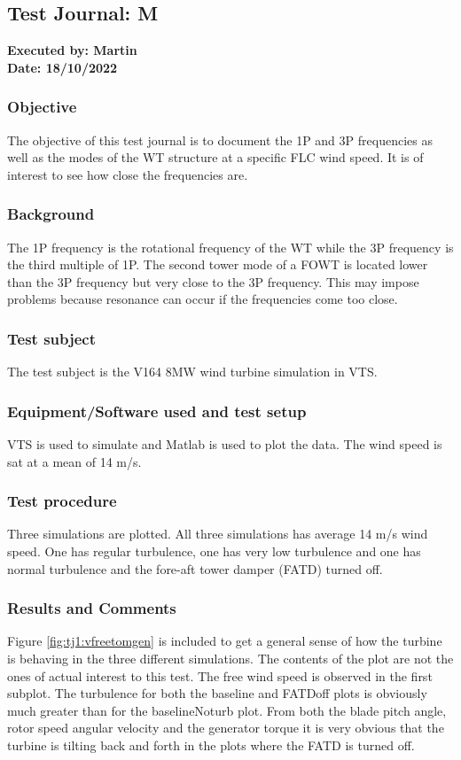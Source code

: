 \subsection{Test Journal: M} \label{app:tj_01}

\textbf{Executed by: Martin} \\
\textbf{Date: 18/10/2022}

\subsubsection{Objective}
The objective of this test journal is to document the 1P and 3P frequencies as well as the modes of the WT structure at a specific FLC wind speed. It is of interest to see how close the frequencies are.

\subsubsection{Background}
The 1P frequency is the rotational frequency of the WT while the 3P frequency is the third multiple of 1P. The second tower mode of a FOWT is located lower than the 3P frequency but very close to the 3P frequency. This may impose problems because resonance can occur if the frequencies come too close.

\subsubsection{Test subject}
The test subject is the V164 8MW wind turbine simulation in VTS.

\subsubsection{Equipment/Software used and test setup}
VTS is used to simulate and Matlab is used to plot the data. The wind speed is sat at a mean of 14 m/s.

\subsubsection{Test procedure}
Three simulations are plotted. All three simulations has average 14 m/s wind speed. One has regular turbulence, one has very low turbulence and one has normal turbulence and the fore-aft tower damper (FATD) turned off.

\subsubsection{Results and Comments}
Figure \cref{fig:tj1:vfreetomgen} is included to get a general sense of how the turbine is behaving in the three different simulations. The contents of the plot are not the ones of actual interest to this test. The free wind speed is observed in the first subplot. The turbulence for both the baseline and FATDoff plots is obviously much greater than for the baselineNoturb plot. From both the blade pitch angle, rotor speed angular velocity and the generator torque it is very obvious that the turbine is tilting back and forth in the plots where the FATD is turned off.

